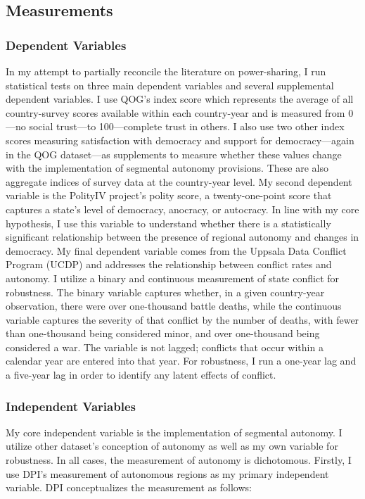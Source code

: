 \documentclass[12pt]{article}
\begin{document}
\subsection{Measurements}
\subsubsection{Dependent Variables} 
In my attempt to partially reconcile the literature on power-sharing, I run statistical tests on three main dependent variables and several supplemental dependent variables. I use QOG’s index score which represents the average of all country-survey scores available within each country-year and is measured from 0---no social trust---to 100---complete trust in others. I also use two other index scores measuring satisfaction with democracy and support for democracy---again in the QOG dataset---as supplements to measure whether these values change with the implementation of segmental autonomy provisions. These are also aggregate indices of survey data at the country-year level. My second dependent variable is the PolityIV project’s polity score, a twenty-one-point score that captures a state’s level of democracy, anocracy, or autocracy. In line with my core hypothesis, I use this variable to understand whether there is a statistically significant relationship between the presence of regional autonomy and changes in democracy. My final dependent variable comes from the Uppsala Data Conflict Program (UCDP) and addresses the relationship between conflict rates and autonomy. I utilize a binary and continuous measurement of state conflict for robustness. The binary variable captures whether, in a given country-year observation, there were over one-thousand battle deaths, while the continuous variable captures the severity of that conflict by the number of deaths, with fewer than one-thousand being considered minor, and over one-thousand being considered a war. The variable is not lagged; conflicts that occur within a calendar year are entered into that year. For robustness, I run a one-year lag and a five-year lag in order to identify any latent effects of conflict. 

\subsubsection{Independent Variables} 
My core independent variable is the implementation of segmental autonomy. I utilize other dataset’s conception of autonomy as well as my own variable for robustness. In all cases, the measurement of autonomy is dichotomous. Firstly, I use DPI's measurement of autonomous regions as my primary independent variable. DPI conceptualizes the measurement as follows:
\end{document}
